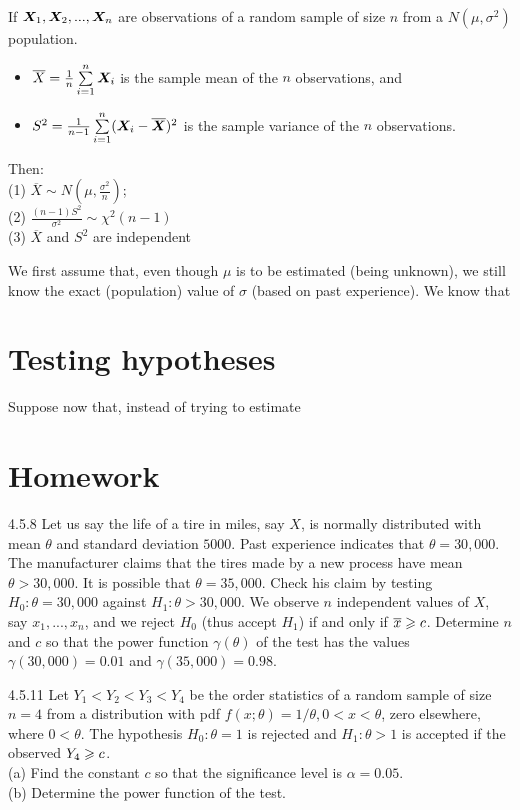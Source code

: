 \begin{corollary}{}{}
    If $\boldsymbol{X}_1,\boldsymbol{X}_2,...,\boldsymbol{X}_n$ are observations of a random sample of size $n$ from a 
    $N(\mu,\sigma^2)$ population.
    \begin{itemize}
        \item $\overline{X}=\frac{1}{n} \sum\limits_{i=1}^{n} \boldsymbol{X}_i$ is the sample mean of the $n$ observations, and
        \item $S^2=\frac{1}{n-1}\sum\limits_{i=1}^{n}(\boldsymbol{X}_i-\overline{\boldsymbol{X}})^2$ is the sample variance of the $n$ observations.
    \end{itemize}
    Then: \\
    (1) $\overline{X}\sim N(\mu,\frac{\sigma^2}{n})$;\\
    (2) $\frac{(n-1)S^2}{\sigma^2}\sim \chi^2(n-1)$\\
    (3) $\overline{X}$ and $S^2$ are independent
\end{corollary}

We first assume that, even though $\mu$ is to be estimated (being unknown), we still
know the exact (population) value of $\sigma$ (based on past experience).
We know that

\section{Testing hypotheses}
Suppose now that, instead of trying to estimate


\section{Homework}
\begin{exercise}{4.5.8}{}
    Let us say the life of a tire in miles, say $X$, 
    is normally distributed with mean
    $\theta$ and standard deviation $5000$.
    Past experience indicates that $\theta = 30,000$.
    The manufacturer claims that the tires made by a new process have mean $\theta>30,000$.
    It is possible that $\theta=35,000$.
    Check his claim by testing $H_0:\theta=30,000$ against
    $H_1:\theta>30,000$. We observe $n$ independent values of $X$, 
    say $x_1,...,x_n$, and we reject $H_0$ (thus accept $H_1$)
    if and only if $\overline{x}\geqslant c$.
    Determine $n$ and $c$ so that the power function $\gamma(\theta)$ of the test
    has the values $\gamma(30,000)=0.01$ and $\gamma(35,000)=0.98$.
\end{exercise}

\begin{exercise}{4.5.11}{}
    Let $Y_1<Y_2<Y_3<Y_4$ be the order statistics of a random sample of size 
    $n=4$ from a distribution with pdf $f(x;\theta)=1/\theta,0<x<\theta$, zero elsewhere,
    where $0<\theta$. The hypothesis $H_0:\theta=1$ is rejected and $H_1:\theta>1$ is accepted if 
    the observed $Y_4\geqslant c$.\\
    (a) Find the constant $c$ so that the significance level is $\alpha=0.05$.\\
    (b) Determine the power function of the test.
\end{exercise}

